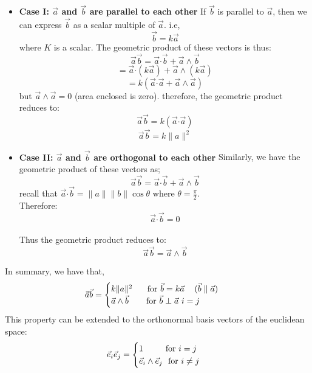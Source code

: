 \documentclass[12pt,onecolumn,letterpaper]{article} %
\begin{document}
\begin{itemize}
    \item \textbf{Case I: $\vec{a}$ and $\vec{b}$ are parallel to each other}
    If $\vec{b}$ is parallel to $\vec{a}$, then we can express $\vec{b}$ as a scalar multiple of $\vec{a}$. i.e,
    $$\vec{b}=k\vec{a}$$ where $K$ is a scalar.
    The geometric product of these vectors is thus:
    $$\vec{a}\vec{b}=\vec{a} \boldsymbol{\cdot} \vec{b}+\vec{a}\wedge\vec{b}$$
    $$=\vec{a} \boldsymbol{\cdot} (k\vec{a})+\vec{a}\wedge (k\vec{a})$$
    $$=k(\vec{a} \boldsymbol{\cdot} \vec{a}+\vec{a}\wedge \vec{a})$$
    but $\vec{a}\wedge \vec{a}=0$ (area enclosed is zero).
    therefore, the geometric product reduces to:
    $$\vec{a}\vec{b}=k(\vec{a} \boldsymbol{\cdot} \vec{a})$$
    $$\vec{a}\vec{b}=k\|a\|^2$$
    \item \textbf{Case II: $\vec{a}$ and $\vec{b}$ are orthogonal to each other}
    Similarly, we have the geometric product of these vectors as;
    $$\vec{a}\vec{b}=\vec{a} \boldsymbol{\cdot} \vec{b}+\vec{a}\wedge\vec{b}$$
    recall that $\vec{a} \boldsymbol{\cdot} \vec{b}=\|a\|\|b\|\cos\theta$
where $\theta=\frac{\pi}{2}$.\\
Therefore:
$$\vec{a} \boldsymbol{\cdot} \vec{b}=0$$\\
Thus the geometric product reduces to:
$$\vec{a}\vec{b}=\vec{a}\wedge\vec{b}$$
\end{itemize}
In summary, we have that,
\begin{equation}
  \vec{a}\vec{b}= \begin{cases} 
      k\|a\|^2 \hspace{.5cm}{\mbox{ for $\vec{b}=k\vec{a}$  \hspace{.3cm}($\vec{b}\parallel \vec{a}$) }} \\
      \vec{a}\wedge\vec{b}\ \hspace{.5cm}{\mbox{ for $\vec{b}\perp \vec{a}$ }} i = j
   \end{cases}\label{geoprod} 
\end{equation}
This property can be extended to the orthonormal basis vectors of the euclidean space:
\begin{equation}
      \vec{e}_i\vec{e}_j= \begin{cases} 
      1\ \hspace{.7cm}{\mbox{ for }} i= j \\
      \vec{e}_i\wedge\vec{e}_j\ {\mbox{ for }} i \neq j
   \end{cases}
   \end{equation}
\end{document}
